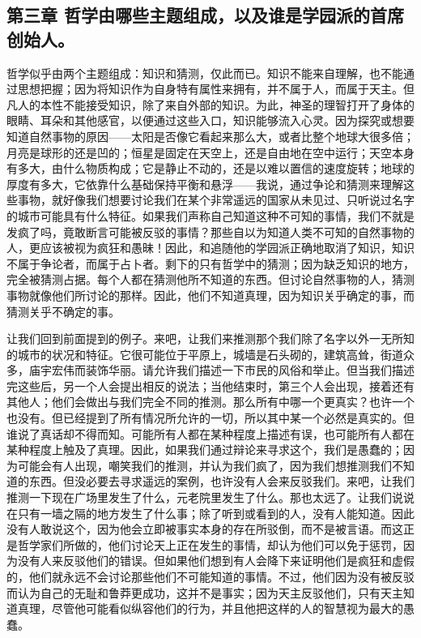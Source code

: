 
\subsection{第三章 哲学由哪些主题组成，以及谁是学园派的首席创始人。}

哲学似乎由两个主题组成：知识和猜测，仅此而已。知识不能来自理解，也不能通过思想把握；因为将知识作为自身特有属性来拥有，并不属于人，而属于天主。但凡人的本性不能接受知识，除了来自外部的知识。为此，神圣的理智打开了身体的眼睛、耳朵和其他感官，以便通过这些入口，知识能够流入心灵。因为探究或想要知道自然事物的原因——太阳是否像它看起来那么大，或者比整个地球大很多倍；月亮是球形的还是凹的；恒星是固定在天空上，还是自由地在空中运行；天空本身有多大，由什么物质构成；它是静止不动的，还是以难以置信的速度旋转；地球的厚度有多大，它依靠什么基础保持平衡和悬浮——我说，通过争论和猜测来理解这些事物，就好像我们想要讨论我们在某个非常遥远的国家从未见过、只听说过名字的城市可能具有什么特征。如果我们声称自己知道这种不可知的事情，我们不就是发疯了吗，竟敢断言可能被反驳的事情？那些自以为知道人类不可知的自然事物的人，更应该被视为疯狂和愚昧！因此，和追随他的学园派正确地取消了知识，知识不属于争论者，而属于占卜者。剩下的只有哲学中的猜测；因为缺乏知识的地方，完全被猜测占据。每个人都在猜测他所不知道的东西。但讨论自然事物的人，猜测事物就像他们所讨论的那样。因此，他们不知道真理，因为知识关乎确定的事，而猜测关乎不确定的事。\par

让我们回到前面提到的例子。来吧，让我们来推测那个我们除了名字以外一无所知的城市的状况和特征。它很可能位于平原上，城墙是石头砌的，建筑高耸，街道众多，庙宇宏伟而装饰华丽。请允许我们描述一下市民的风俗和举止。但当我们描述完这些后，另一个人会提出相反的说法；当他结束时，第三个人会出现，接着还有其他人；他们会做出与我们完全不同的推测。那么所有中哪一个更真实？也许一个也没有。但已经提到了所有情况所允许的一切，所以其中某一个必然是真实的。但谁说了真话却不得而知。可能所有人都在某种程度上描述有误，也可能所有人都在某种程度上触及了真理。因此，如果我们通过辩论来寻求这个，我们是愚蠢的；因为可能会有人出现，嘲笑我们的推测，并认为我们疯了，因为我们想推测我们不知道的东西。但没必要去寻求遥远的案例，也许没有人会来反驳我们。来吧，让我们推测一下现在广场里发生了什么，元老院里发生了什么。那也太远了。让我们说说在只有一墙之隔的地方发生了什么事；除了听到或看到的人，没有人能知道。因此没有人敢说这个，因为他会立即被事实本身的存在所驳倒，而不是被言语。而这正是哲学家们所做的，他们讨论天上正在发生的事情，却认为他们可以免于惩罚，因为没有人来反驳他们的错误。但如果他们想到有人会降下来证明他们是疯狂和虚假的，他们就永远不会讨论那些他们不可能知道的事情。不过，他们因为没有被反驳而认为自己的无耻和鲁莽更成功，这并不是事实；因为天主反驳他们，只有天主知道真理，尽管他可能看似纵容他们的行为，并且他把这样的人的智慧视为最大的愚蠢。\par

